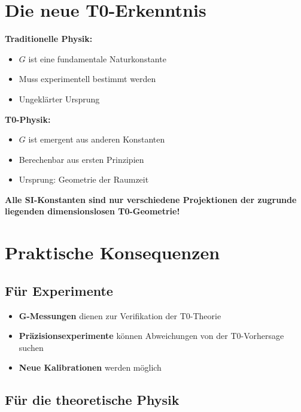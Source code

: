 \documentclass[12pt,a4paper]{article}
\theoremstyle{definition}
\begin{document}
	\section{Die neue T0-Erkenntnis}
	
	\begin{revolution}
		\textbf{Traditionelle Physik:}
		\begin{itemize}
			\item $G$ ist eine fundamentale Naturkonstante
			\item Muss experimentell bestimmt werden
			\item Ungeklärter Ursprung
		\end{itemize}
		
		\textbf{T0-Physik:}
		\begin{itemize}
			\item $G$ ist emergent aus anderen Konstanten
			\item Berechenbar aus ersten Prinzipien
			\item Ursprung: Geometrie der Raumzeit
		\end{itemize}
		
		\textbf{Alle SI-Konstanten sind nur verschiedene Projektionen der zugrunde liegenden dimensionslosen T0-Geometrie!}
	\end{revolution}
	
	\section{Praktische Konsequenzen}
	
	\subsection{Für Experimente}
	
	\begin{itemize}
		\item \textbf{G-Messungen} dienen zur Verifikation der T0-Theorie
		\item \textbf{Präzisionsexperimente} können Abweichungen von der T0-Vorhersage suchen
		\item \textbf{Neue Kalibrationen} werden möglich
	\end{itemize}
	
	\subsection{Für die theoretische Physik}
	
\end{document}
